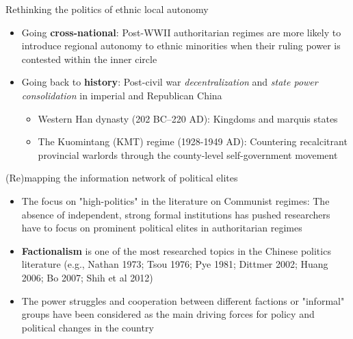 \documentclass[
  10pt,
  ignorenonframetext,
]{beamer}
\begin{document}
\begin{frame}{Rethinking the politics of ethnic local autonomy}
\label{rethinking-the-politics-of-ethnic-local-autonomy-5}
\begin{itemize}
  \item Going \textbf{cross-national}: Post-WWII authoritarian regimes are more likely to introduce regional autonomy to ethnic minorities when their ruling power is contested within the inner circle
  \vspace{0.6cm}
  \item Going back to \textbf{history}: Post-civil war \textit{decentralization} and \textit{state power consolidation} in imperial and Republican China
  \vspace{0.2cm}
  \begin{itemize}
    \item Western Han dynasty (202 BC–220 AD): Kingdoms and marquis states
    \item The Kuomintang (KMT) regime (1928-1949 AD): Countering recalcitrant provincial warlords through the county-level self-government movement
  \end{itemize}
\end{itemize}
\end{frame}

\begin{frame}{(Re)mapping the information network of political elites}
\label{remapping-the-information-network-of-political-elites}
\begin{itemize}
  \item The focus on "high-politics" in the literature on Communist regimes: The absence of independent, strong formal institutions has pushed researchers have to focus on prominent political elites in authoritarian regimes
  \vspace{0.3cm}
  \item \textbf{Factionalism} is one of the most researched topics in the Chinese politics literature (e.g., Nathan 1973; Tsou 1976; Pye 1981; Dittmer 2002; Huang 2006; Bo 2007; Shih et al 2012)
  \vspace{0.3cm}
  \item The power struggles and cooperation between different factions or "informal" groups have been considered as the main driving forces for policy and political changes in the country
\end{itemize}
\end{frame}
\end{document}
